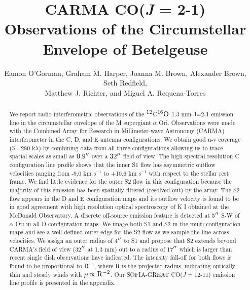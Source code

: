 \documentclass[iop]{emulateapj}
\begin{document}
\title{CARMA CO(\textit{J} = 2-1) Observations of the Circumstellar Envelope of Betelgeuse}


\author{Eamon O'Gorman, Graham M. Harper, Joanna M. Brown, Alexander Brown, Seth Redfield,\\ Matthew J. Richter, and Miguel A. Requena-Torres}


\begin{abstract}
We report radio interferometric observations of the $\rm{{}^{12}}$C$\rm{{}^{16}}O$ 1.3 mm J=2-1 emission line in the circumstellar envelope of the M supergiant $\alpha$ Ori.  Observations were made with the Combined Array for Research in Millimeter-wave Astronomy (CARMA) interferometer in the C, D, and E antenna configurations. We obtain good u-v coverage (5 - 280 k$\lambda$) by combining data from all three configurations allowing us to trace spatial scales as small as $0.9\mbox{$^{\prime\prime}$}$ over a $32\mbox{$^{\prime\prime}$}$ field of view. The high spectral resolution C configuration line profile shows that the inner S1 flow has asymmetric outflow velocities ranging from -9.0 km s${}^{-1}$ to +10.6 km s${}^{-1}$ with respect to the stellar rest frame. We find little evidence  for the outer S2 flow in this configuration because the majority of this emission has been spatially-filtered (resolved out) by the array. The S2 flow appears in the D and E configuration maps and its outflow velocity is found to be in good agreement with high resolution optical spectroscopy of K I obtained at the McDonald Observatory. A discrete off-source emission feature is detected at 5$\mbox{$^{\prime\prime}$}$ S-W of  $\alpha$ Ori in all D configuration maps. We image both S1 and S2 in the multi-configuration maps and see a well defined outer edge for the S2 flow as we sample the line across velocities. We assign an outer radius of 4$\mbox{$^{\prime\prime}$}$ to S1 and propose that S2 extends beyond CARMA's field of view (32$\mbox{$^{\prime\prime}$}$ at 1.3 mm) out to a radius of 17$\mbox{$^{\prime\prime}$}$ which is larger than recent single dish observations have indicated. The intensity fall-off for both flows is found to be proportional to R$^{-1}$, where R is the projected radius, indicating optically thin and steady winds with $\rm{\rho \propto R^{-2}}$. Our SOFIA-GREAT CO(\textit{J} = 12-11) emission line profile is presented in the appendix.
\end{abstract}
\end{document}
